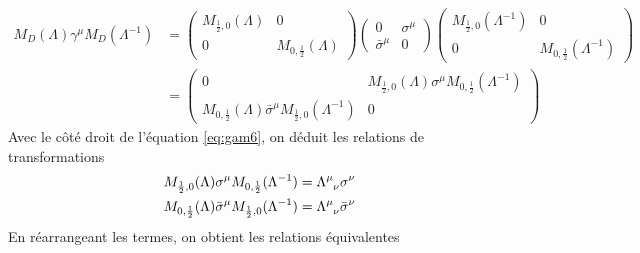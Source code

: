 \documentclass{article}
\numberwithin{equation}{section}
\theoremstyle{solution}
\begin{document}
\begin{align*}
        M_D(\Lambda) \gamma^{\mu}M_D(\Lambda^{-1}) &= 
        \begin{pmatrix}
                M_{\frac{1}{2},0}(\Lambda) & 0 \\
        0 & M_{0, \frac{1}{2}}(\Lambda)
        \end{pmatrix}
        \begin{pmatrix}
                0 & \sigma^{\mu} \\
                \bar{\sigma}^{\mu} & 0
        \end{pmatrix}
        \begin{pmatrix}
                M_{\frac{1}{2},0}(\Lambda^{-1}) & 0 \\
        0 & M_{0, \frac{1}{2}}(\Lambda^{-1})
        \end{pmatrix} \\
        &= 
        \begin{pmatrix}
                0 & M_{\frac{1}{2},0}(\Lambda)\sigma^{\mu}M_{0,\frac{1}{2}}(\Lambda^{-1})  \\
                M_{0, \frac{1}{2}}(\Lambda)\bar{\sigma}^{\mu} M_{\frac{1}{2},0}(\Lambda^{-1}) & 0
        \end{pmatrix}
\end{align*}
Avec le côté droit de l'équation \eqref{eq:gam6}, on déduit les relations de transformations
\begin{equation}
\begin{split}
        M_{\frac{1}{2},0}(\Lambda)\sigma^{\mu}M_{0,\frac{1}{2}}(\Lambda^{-1}) &= \Lambda\indices{^{\mu}_{\nu}}\sigma^{\nu}\\
        M_{0, \frac{1}{2}}(\Lambda)\bar{\sigma}^{\mu} M_{\frac{1}{2},0}(\Lambda^{-1}) &= \Lambda\indices{^{\mu}_{\nu}}\bar{\sigma}^{\nu}
\end{split}
\end{equation} 
En réarrangeant les termes, on obtient les relations équivalentes
\end{document}
